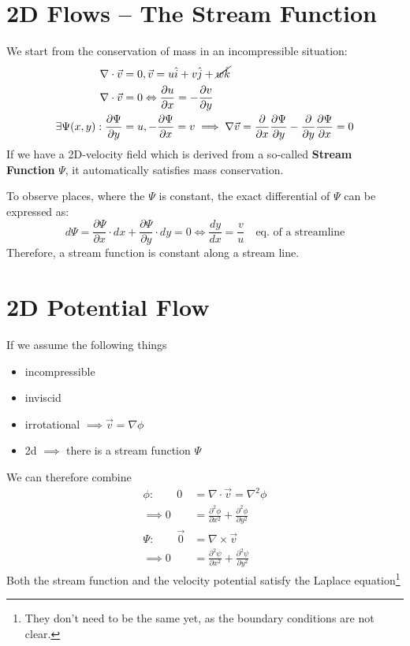\section{2D Flows -- The Stream Function}
We start from the conservation of mass in an incompressible situation:
\begin{equation*}
	\begin{split}
		\nabla \cdot \vec v &= 0, \vec v = u\hat i + v\hat j + \cancel{w\hat k}\\
		\nabla \cdot \vec v &= 0 \Leftrightarrow \frac{\partial u}{\partial x} = - \frac{\partial v }{\partial y}\\
		\exists \Psi(x,y) :  \frac{\partial \Psi}{\partial y} &= u, -\frac{\partial \Psi}{\partial x} = v\implies \nabla \vec v = \frac{\partial}{\partial x}\frac{\partial \Psi}{\partial y} - \frac{\partial}{\partial y} \frac{\partial \Psi}{\partial x} = 0
	\end{split}
\end{equation*}
If we have a 2D-velocity field which is derived from a so-called \textbf{Stream Function} $\Psi$, it automatically satisfies mass conservation.

To observe places, where the $\Psi$ is constant, the exact differential of $\Psi$ can be expressed as:
\begin{equation*}
	d\Psi = \frac{\partial \Psi}{\partial x}\cdot dx + \frac{\partial \Psi}{\partial y}\cdot dy = 0\Leftrightarrow \frac{dy}{dx} = \frac{v}{u}\quad \text{eq. of a streamline}
\end{equation*}
Therefore, a stream function is constant along a stream line.

\section{2D Potential Flow}
If we assume the following things
\begin{itemize}
	\setlength{\itemsep}{-5pt}
	\item incompressible
	\item inviscid
	\item irrotational $\implies \vec v = \nabla \phi$
	\item 2d $\implies $ there is a stream function $\Psi$
\end{itemize}
We can therefore combine
\begin{equation*}
	\begin{split}
		\phi:\qquad 0 &= \nabla \cdot \vec v = \nabla^2 \phi \\
		\implies 0&=\frac{\partial^2 \phi}{\partial x^2}+ \frac{\partial ^2 \phi}{\partial y^2} \\
		\Psi: \qquad \vec 0 &= \nabla \times \vec v\\\implies 0 &= \frac{\partial ^2 \psi}{\partial x^2}+ \frac{\partial ^2 \psi}{\partial y^2}
	\end{split}
\end{equation*}
Both the stream function and the velocity potential satisfy the Laplace equation\footnote{They don't need to be the same yet, as the boundary conditions are not clear.}


